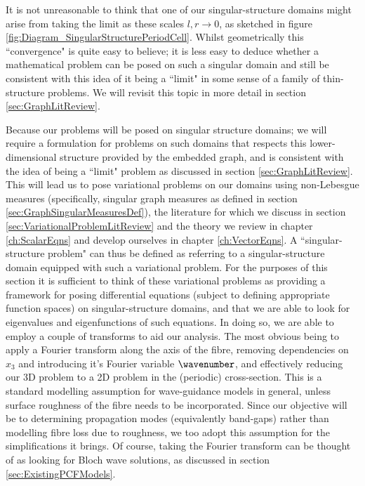It is not unreasonable to think that one of our singular-structure domains might arise from taking the limit as these scales $l,r\rightarrow0$, as sketched in figure \ref{fig:Diagram_SingularStructurePeriodCell}.
Whilst geometrically this ``convergence" is quite easy to believe; it is less easy to deduce whether a mathematical problem can be posed on such a singular domain and still be consistent with this idea of it being a ``limit" in some sense of a family of thin-structure problems.
We will revisit this topic in more detail in section \ref{sec:GraphLitReview}. \newline

Because our problems will be posed on singular structure domains; we will require a formulation for problems on such domains that respects this lower-dimensional structure provided by the embedded graph, and is consistent with the idea of being a ``limit" problem as discussed in section \ref{sec:GraphLitReview}.
This will lead us to pose variational problems on our domains using non-Lebesgue measures (specifically, singular graph measures as defined in section \ref{sec:GraphSingularMeasuresDef}), the literature for which we discuss in section \ref{sec:VariationalProblemLitReview} and the theory we review in chapter \ref{ch:ScalarEqns} and develop ourselves in chapter \ref{ch:VectorEqns}.
A ``singular-structure problem" can thus be defined as referring to a singular-structure domain equipped with such a variational problem.
For the purposes of this section it is sufficient to think of these variational problems as providing a framework for posing differential equations (subject to defining appropriate function spaces) on singular-structure domains, and that we are able to look for eigenvalues and eigenfunctions of such equations.
In doing so, we are able to employ a couple of transforms to aid our analysis.
The most obvious being to apply a Fourier transform along the axis of the fibre, removing dependencies on $x_3$ and introducing it's Fourier variable $\wavenumber$, and effectively reducing our 3D problem to a 2D problem in the (periodic) cross-section.
This is a standard modelling assumption for wave-guidance models in general, unless surface roughness of the fibre needs to be incorporated.
Since our objective will be to determining propagation modes (equivalently band-gaps) rather than modelling fibre loss due to roughness, we too adopt this assumption for the simplifications it brings.
Of course, taking the Fourier transform can be thought of as looking for Bloch wave solutions, as discussed in section \ref{sec:ExistingPCFModels}. \newline

